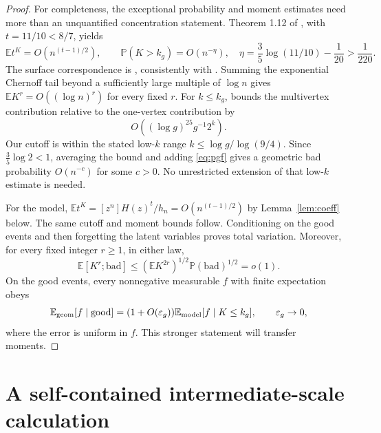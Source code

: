 \documentclass[11pt]{article}
\theoremstyle{remark}\newtheorem{remark}[theorem]{Remark}
\newcommand{\E}{\mathbb E}\newcommand{\Prob}{\mathbb P}
\begin{document}
\begin{proof}
For completeness, the exceptional probability and moment estimates need more than an unquantified concentration statement. Theorem 1.12 of \cite{DGZZ}, with $t=11/10<8/7$, yields
\begin{equation}\label{eq:pgf}
 \E t^K=O(n^{(t-1)/2}),\qquad
 \Prob(K>k_g)=O(n^{-\eta}),\quad
 \eta=\frac35\log(11/10)-\frac1{20}>\frac1{220}.
\end{equation}
The surface correspondence is \cite[Theorem 1.7]{DGZZ}, consistently with \cite[Theorem 1.4]{DL}. Summing the exponential Chernoff tail beyond a sufficiently large multiple of $\log n$ gives $\E K^r=O((\log n)^r)$ for every fixed $r$. For $k\le k_g$, \cite[Theorem 5.2]{DGZZ} bounds the multivertex contribution relative to the one-vertex contribution by
\[
 O\left((\log g)^{25}g^{-1}2^k\right).
\]
Our cutoff is within the stated low-$k$ range $k\le\log g/\log(9/4)$. Since $\tfrac35\log2<1$, averaging the bound and adding \eqref{eq:pgf} gives a geometric bad probability $O(n^{-c})$ for some $c>0$. No unrestricted extension of that low-$k$ estimate is needed.

For the model, $\E t^K=[z^n]H(z)^t/h_n=O(n^{(t-1)/2})$ by Lemma~\ref{lem:coeff} below. The same cutoff and moment bounds follow. Conditioning on the good events and then forgetting the latent variables proves total variation. Moreover, for every fixed integer $r\ge1$, in either law,
\begin{equation}\label{eq:badmoment}
 \E[K^r;\mathrm{bad}]\le(\E K^{2r})^{1/2}\Prob(\mathrm{bad})^{1/2}=o(1).
\end{equation}
On the good events, every nonnegative measurable $f$ with finite expectation obeys
\begin{equation}\label{eq:RN}
 \E_{\rm geom}[f\mid\mathrm{good}]=(1+O(\varepsilon_g))
 \E_{\rm model}[f\mid K\le k_g],\qquad\varepsilon_g\to0,
\end{equation}
where the error is uniform in $f$. This stronger statement will transfer moments.
\end{proof}

\section{A self-contained intermediate-scale calculation}
\end{document}
